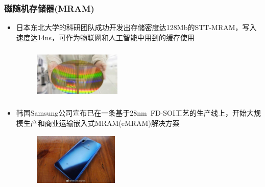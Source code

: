\documentclass[cjk,slidestop,compress,mathserif,blue]{beamer}
\begin{document}
\frame
{
	\frametitle{磁随机存储器\textrm{(MRAM)}}
	\begin{itemize}
		\item {\tiny \textrm{日本东北大学的科研团队成功开发出存储密度达128\textrm{Mb}的\textrm{STT-MRAM}，写入速度达14\textrm{ns}，可作为物联网和人工智能中用到的缓存使用}}
\begin{figure}[h!]
\vspace*{-0.08in}
\centering
\includegraphics[height=1.00in,width=1.65in]{Figures/Si-crystal-Surface.png}
\label{Fig:Si-crystal-surface}
\end{figure}
\item {\tiny \textrm{韩国\textrm{Samsung}公司宣布已在一条基于28\textrm{nm~FD-SOI}工艺的生产线上，开始大规模生产和商业运输嵌入式\textrm{MRAM(eMRAM)}解决方案}}
\begin{figure}[h!]
\vspace*{-0.08in}
\centering
\includegraphics[height=1.00in,width=1.60in]{Figures/Samsung-cell.png}
\label{Fig:Samsung-cell}
\end{figure}
	\end{itemize}
}
\end{document}
